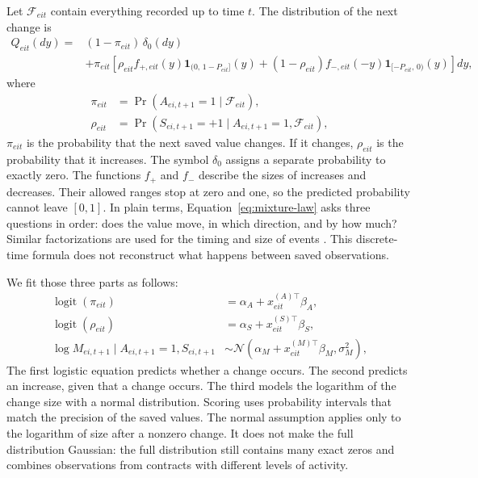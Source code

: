 \documentclass[10pt,twoside]{article}
\begin{document}
Let $\mathcal F_{e i t}$ contain everything recorded up to time $t$. The distribution of the next change is
\begin{equation}
\begin{split}
  Q_{e i t}(dy)
  ={}&(1-\pi_{e i t})\,\delta_0(dy) \\
  &+\pi_{e i t}\left[
  \rho_{e i t} f_{+,e i t}(y)\mathbf 1_{(0,\,1-P_{e i t}]}(y)
  +(1-\rho_{e i t}) f_{-,e i t}(-y)\mathbf 1_{[-P_{e i t},\,0)}(y)
  \right]dy,
  \label{eq:mixture-law}
\end{split}
\end{equation}
where
\begin{align}
  \pi_{e i t}&=\Pr(A_{e i,t+1}=1\mid\mathcal F_{e i t}), \\
  \rho_{e i t}&=\Pr(S_{e i,t+1}=+1\mid A_{e i,t+1}=1,\mathcal F_{e i t}),
\end{align}
$\pi_{e i t}$ is the probability that the next saved value changes. If it changes, $\rho_{e i t}$ is the probability that it increases. The symbol $\delta_0$ assigns a separate probability to exactly zero. The functions $f_+$ and $f_-$ describe the sizes of increases and decreases. Their allowed ranges stop at zero and one, so the predicted probability cannot leave $[0,1]$. In plain terms, Equation~\eqref{eq:mixture-law} asks three questions in order: does the value move, in which direction, and by how much? Similar factorizations are used for the timing and size of events \citep{hawkes1971,bacry2013}. This discrete-time formula does not reconstruct what happens between saved observations.

We fit those three parts as follows:
\begin{align}
  \operatorname{logit}(\pi_{e i t})
  &=\alpha_A+x^{(A)\top}_{e i t}\beta_A, \\
  \operatorname{logit}(\rho_{e i t})
  &=\alpha_S+x^{(S)\top}_{e i t}\beta_S, \\
  \log M_{e i,t+1}\mid A_{e i,t+1}=1,S_{e i,t+1}
  &\sim\mathcal N\!\left(\alpha_M+x^{(M)\top}_{e i t}\beta_M,\sigma_M^2\right),
  \label{eq:component-models}
\end{align}
The first logistic equation predicts whether a change occurs. The second predicts an increase, given that a change occurs. The third models the logarithm of the change size with a normal distribution. Scoring uses probability intervals that match the precision of the saved values. The normal assumption applies only to the logarithm of size after a nonzero change. It does not make the full distribution Gaussian: the full distribution still contains many exact zeros and combines observations from contracts with different levels of activity.
\end{document}
